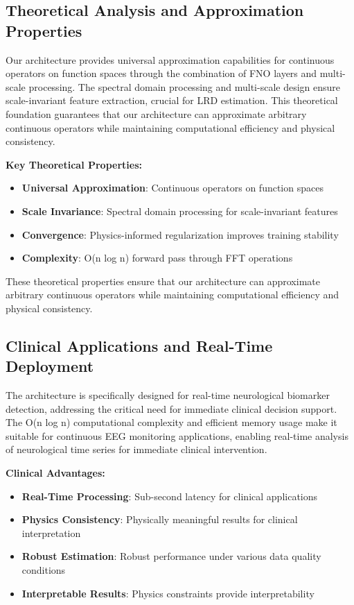 \subsection{Theoretical Analysis and Approximation Properties}

Our architecture provides universal approximation capabilities for continuous operators on function spaces through the combination of FNO layers and multi-scale processing. The spectral domain processing and multi-scale design ensure scale-invariant feature extraction, crucial for LRD estimation. This theoretical foundation guarantees that our architecture can approximate arbitrary continuous operators while maintaining computational efficiency and physical consistency.

\textbf{Key Theoretical Properties:}
\begin{itemize}
    \item \textbf{Universal Approximation}: Continuous operators on function spaces
    \item \textbf{Scale Invariance}: Spectral domain processing for scale-invariant features
    \item \textbf{Convergence}: Physics-informed regularization improves training stability
    \item \textbf{Complexity}: O(n log n) forward pass through FFT operations
\end{itemize}

These theoretical properties ensure that our architecture can approximate arbitrary continuous operators while maintaining computational efficiency and physical consistency.

\subsection{Clinical Applications and Real-Time Deployment}

The architecture is specifically designed for real-time neurological biomarker detection, addressing the critical need for immediate clinical decision support. The O(n log n) computational complexity and efficient memory usage make it suitable for continuous EEG monitoring applications, enabling real-time analysis of neurological time series for immediate clinical intervention.

\textbf{Clinical Advantages:}
\begin{itemize}
    \item \textbf{Real-Time Processing}: Sub-second latency for clinical applications
    \item \textbf{Physics Consistency}: Physically meaningful results for clinical interpretation
    \item \textbf{Robust Estimation}: Robust performance under various data quality conditions
    \item \textbf{Interpretable Results}: Physics constraints provide interpretability
\end{itemize}

